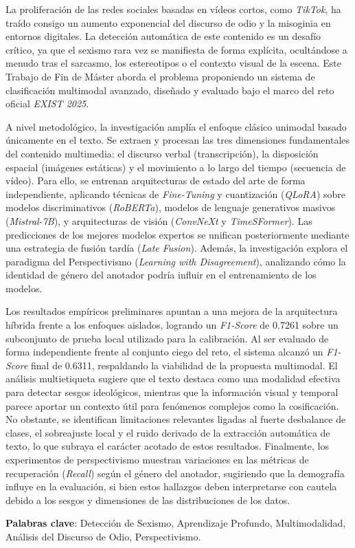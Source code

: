 \begin{resumen}
La proliferación de las redes sociales basadas en vídeos cortos, como \textit{TikTok}, ha traído consigo un aumento exponencial del discurso de odio y la misoginia en entornos digitales. La detección automática de este contenido es un desafío crítico, ya que el sexismo rara vez se manifiesta de forma explícita, ocultándose a menudo tras el sarcasmo, los estereotipos o el contexto visual de la escena. Este Trabajo de Fin de Máster aborda el problema proponiendo un sistema de clasificación multimodal avanzado, diseñado y evaluado bajo el marco del reto oficial \textit{EXIST 2025}.

A nivel metodológico, la investigación amplía el enfoque clásico unimodal basado únicamente en el texto. Se extraen y procesan las tres dimensiones fundamentales del contenido multimedia: el discurso verbal (transcripción), la disposición espacial (imágenes estáticas) y el movimiento a lo largo del tiempo (secuencia de vídeo). Para ello, se entrenan arquitecturas de estado del arte de forma independiente, aplicando técnicas de \textit{Fine-Tuning} y cuantización (\textit{QLoRA}) sobre modelos discriminativos (\textit{RoBERTa}), modelos de lenguaje generativos masivos (\textit{Mistral-7B}), y arquitecturas de visión (\textit{ConvNeXt} y \textit{TimeSFormer}). Las predicciones de los mejores modelos expertos se unifican posteriormente mediante una estrategia de fusión tardía (\textit{Late Fusion}). Además, la investigación explora el paradigma del Perspectivismo (\textit{Learning with Disagreement}), analizando cómo la identidad de género del anotador podría influir en el entrenamiento de los modelos. 

Los resultados empíricos preliminares apuntan a una mejora de la arquitectura híbrida frente a los enfoques aislados, logrando un \textit{F1-Score} de 0.7261 sobre un subconjunto de prueba local utilizado para la calibración. Al ser evaluado de forma independiente frente al conjunto ciego del reto, el sistema alcanzó un \textit{F1-Score} final de 0.6311, respaldando la viabilidad de la propuesta multimodal. El análisis multietiqueta sugiere que el texto destaca como una modalidad efectiva para detectar sesgos ideológicos, mientras que la información visual y temporal parece aportar un contexto útil para fenómenos complejos como la cosificación. No obstante, se identifican limitaciones relevantes ligadas al fuerte desbalance de clases, el sobreajuste local y el ruido derivado de la extracción automática de texto, lo que subraya el carácter acotado de estos resultados. Finalmente, los experimentos de perspectivismo muestran variaciones en las métricas de recuperación (\textit{Recall}) según el género del anotador, sugiriendo que la demografía influye en la evaluación, si bien estos hallazgos deben interpretarse con cautela debido a los sesgos y dimensiones de las distribuciones de los datos.

\noindent\textbf{Palabras clave}: Detección de Sexismo, Aprendizaje Profundo, Multimodalidad, Análisis del Discurso de Odio, Perspectivismo.
\end{resumen}

